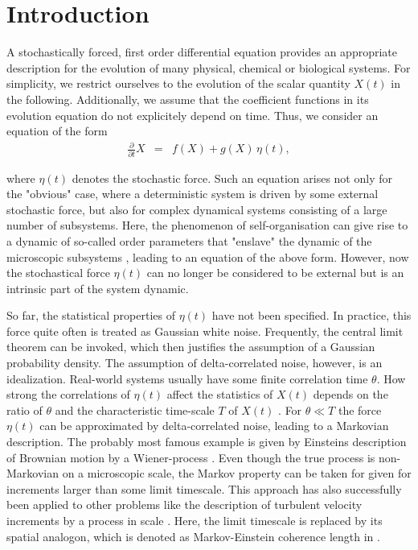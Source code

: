 \documentclass[aps,twocolumn,superscriptaddress,showpacs,showkeys]{revtex4}
\newcommand{\p}{\partial}
\newcommand{\fracpp}[1]{\frac{\p}{\p#1}}
\begin{document}
\section{Introduction}
\label{sec_intro}

\noindent A stochastically forced, first order differential equation provides an appropriate description for the evolution
of many physical, chemical or biological systems. For simplicity, we restrict ourselves to the evolution of the
scalar quantity $X(t)$ in the following. Additionally, we assume that the coefficient functions in its evolution equation
do not explicitely depend on time. Thus, we consider an equation of  the form
%
\begin{eqnarray}\label{evolution_X}
\fracpp{t} X &=& f(X) +g(X)\,\eta(t),
\end{eqnarray}

\noindent where $\eta(t)$ denotes the stochastic force. Such an equation arises not only for the
"obvious" case, where a deterministic system is driven by some external stochastic force, but also for complex dynamical
systems consisting of a large number of subsystems. Here, the phenomenon of self-organisation can give rise to a dynamic
of so-called order parameters that "enslave" the dynamic of the microscopic subsystems
\cite{haken04}, leading to an equation of the above form. However, now the stochastical force $\eta(t)$ can
no longer be considered to be external but is an intrinsic part of the system dynamic.

So far, the statistical properties of $\eta(t)$ have not been specified. In practice, this force quite often is treated as
Gaussian white noise. Frequently, the central limit theorem can be invoked, which then justifies the assumption of a Gaussian
probability density. The assumption of delta-correlated noise, however, is an idealization. Real-world systems usually have
some finite correlation time $\theta$.
How strong the correlations of $\eta(t)$ affect the statistics of $X(t)$ depends on the ratio of $\theta$ and the
characteristic time-scale $T$ of $X(t)$ \cite{haenggi95}. For $\theta\ll T$ the force $\eta(t)$ can be approximated by
delta-correlated noise, leading to a Markovian description. The probably most famous example is given by Einsteins description
of Brownian motion by a Wiener-process \cite{einstein05}. Even though the true process is non-Markovian on a microscopic scale,
the Markov property can be taken for given for increments larger than some limit timescale. This approach has also successfully
been applied to other problems like the description of turbulent velocity increments by a process in scale
\cite{friedrich97,renner01}. Here, the limit timescale is replaced by its spatial analogon, which is
denoted as Markov-Einstein coherence length in \cite{lueck06}.
\end{document}
